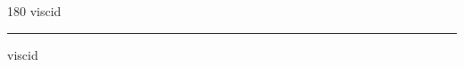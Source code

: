 
\begin{frame}
\begin{center}
\begin{turn}{180}
{\fontsize{2.5cm}{1em}\selectfont viscid}
\end{turn}
\vspace{1em}\par  
\hrule
\vspace{1em}\par  
{\fontsize{2.5cm}{1em}\selectfont viscid}
\end{center}
\end{frame}
